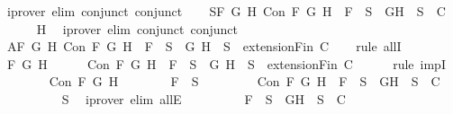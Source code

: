\begin{isabellebody}
\ {\isacharparenleft}iprover\ elim{\isacharcolon}\ conjunct{}\ conjunct{}{\isacharparenright}\isanewline
\ \ \isamarkupfalse%
\ S{}{\isacharcolon}{\isachardoublequoteopen}{\isasymforall}F\ G\ H{\isachardot}\ Con\ F\ G\ H\ {\isasymlongrightarrow}\ F\ {\isasymin}\ S\ {\isasymlongrightarrow}\ {\isacharbraceleft}G{\isacharcomma}H{\isacharbraceright}\ {\isasymunion}\ S\ {\isasymin}\ C{\isachardoublequoteclose}\isanewline
\ \ \ \ \isamarkupfalse%
\ H\ \isamarkupfalse%
\ {\isacharparenleft}iprover\ elim{\isacharcolon}\ conjunct{}\ conjunct{}{\isacharparenright}\isanewline
\ \ \isamarkupfalse%
\ A{}{\isacharcolon}{\isachardoublequoteopen}{\isasymforall}F\ G\ H{\isachardot}\ Con\ F\ G\ H\ {\isasymlongrightarrow}\ F\ {\isasymin}\ S\ {\isasymlongrightarrow}\ {\isacharbraceleft}G{\isacharcomma}\ H{\isacharbraceright}\ {\isasymunion}\ S\ {\isasymin}\ {\isacharparenleft}extensionFin\ C{\isacharparenright}{\isachardoublequoteclose}\isanewline
\ \ \isamarkupfalse%
\ {\isacharparenleft}rule\ allI{\isacharparenright}{\isacharplus}\isanewline
\ \ \ \ \isamarkupfalse%
\ F\ G\ H\isanewline
\ \ \ \ \isamarkupfalse%
\ {\isachardoublequoteopen}Con\ F\ G\ H\ {\isasymlongrightarrow}\ F\ {\isasymin}\ S\ {\isasymlongrightarrow}\ {\isacharbraceleft}G{\isacharcomma}\ H{\isacharbraceright}\ {\isasymunion}\ S\ {\isasymin}\ {\isacharparenleft}extensionFin\ C{\isacharparenright}{\isachardoublequoteclose}\isanewline
\ \ \ \ \isamarkupfalse%
\ {\isacharparenleft}rule\ impI{\isacharparenright}{\isacharplus}\isanewline
\ \ \ \ \ \ \isamarkupfalse%
\ {\isachardoublequoteopen}Con\ F\ G\ H{\isachardoublequoteclose}\isanewline
\ \ \ \ \ \ \isamarkupfalse%
\ {\isachardoublequoteopen}F\ {\isasymin}\ S{\isachardoublequoteclose}\ \isanewline
\ \ \ \ \ \ \isamarkupfalse%
\ {\isachardoublequoteopen}Con\ F\ G\ H\ {\isasymlongrightarrow}\ F\ {\isasymin}\ S\ {\isasymlongrightarrow}\ {\isacharbraceleft}G{\isacharcomma}H{\isacharbraceright}\ {\isasymunion}\ S\ {\isasymin}\ C{\isachardoublequoteclose}\isanewline
\ \ \ \ \ \ \ \ \isamarkupfalse%
\ S{}\ \isamarkupfalse%
\ {\isacharparenleft}iprover\ elim{\isacharcolon}\ allE{\isacharparenright}\isanewline
\ \ \ \ \ \ \isamarkupfalse%
\ \isamarkupfalse%
\ {\isachardoublequoteopen}F\ {\isasymin}\ S\ {\isasymlongrightarrow}\ {\isacharbraceleft}G{\isacharcomma}H{\isacharbraceright}\ {\isasymunion}\ S\ {\isasymin}\ C{\isachardoublequoteclose}\isanewline

\end{isabellebody}
